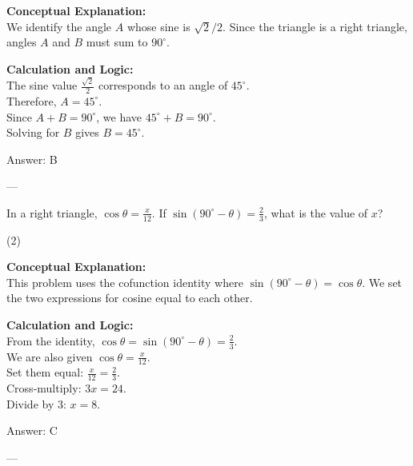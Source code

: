 \documentclass[11pt,paper=a4,answers]{exam}
\begin{document}
\begin{questions}
\begin{solution}
\textbf{Conceptual Explanation:} \\
We identify the angle $A$ whose sine is $\sqrt{2}/2$. Since the triangle is a right triangle, angles $A$ and $B$ must sum to $90^\circ$.

\vspace{10pt}
\textbf{Calculation and Logic:} \\
The sine value $\frac{\sqrt{2}}{2}$ corresponds to an angle of $45^\circ$. \\
Therefore, $A = 45^\circ$. \\
Since $A + B = 90^\circ$, we have $45^\circ + B = 90^\circ$. \\
Solving for $B$ gives $B = 45^\circ$.

\vspace{15pt}
Answer: \colorbox{yellow!100}{B}
\end{solution}

---

\question
In a right triangle, $\cos \theta = \frac{x}{12}$. If $\sin(90^\circ - \theta) = \frac{2}{3}$, what is the value of $x$?
\begin{tasks}(2)
\end{tasks}

\begin{solution}
\textbf{Conceptual Explanation:} \\
This problem uses the cofunction identity where $\sin(90^\circ - \theta) = \cos \theta$. We set the two expressions for cosine equal to each other.

\vspace{10pt}
\textbf{Calculation and Logic:} \\
From the identity, $\cos \theta = \sin(90^\circ - \theta) = \frac{2}{3}$. \\
We are also given $\cos \theta = \frac{x}{12}$. \\
Set them equal: $\frac{x}{12} = \frac{2}{3}$. \\
Cross-multiply: $3x = 24$. \\
Divide by 3: $x = 8$.

\vspace{15pt}
Answer: \colorbox{yellow!100}{C}
\end{solution}

---


\end{questions}
\end{document}
